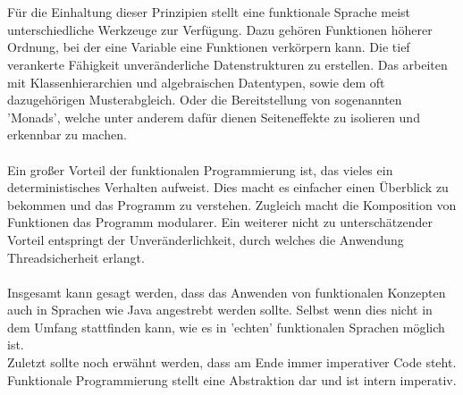 \\\\
Für die Einhaltung dieser Prinzipien stellt eine funktionale Sprache meist unterschiedliche Werkzeuge zur Verfügung. Dazu gehören Funktionen höherer Ordnung, bei der eine Variable eine Funktionen verkörpern kann. Die tief verankerte Fähigkeit unveränderliche Datenstrukturen zu erstellen. Das arbeiten mit Klassenhierarchien und algebraischen Datentypen, sowie dem oft dazugehörigen Musterabgleich. Oder die Bereitstellung von sogenannten 'Monads', welche unter anderem dafür dienen Seiteneffekte zu isolieren und erkennbar zu machen.
\\\\
Ein großer Vorteil der funktionalen Programmierung ist, das vieles ein deterministisches Verhalten aufweist. Dies macht es einfacher einen Überblick zu bekommen und das Programm zu verstehen. Zugleich macht die Komposition von Funktionen das Programm modularer. Ein weiterer nicht zu unterschätzender Vorteil entspringt der Unveränderlichkeit, durch welches die Anwendung Threadsicherheit erlangt.
\\\\
Insgesamt kann gesagt werden, dass das Anwenden von funktionalen Konzepten auch in Sprachen wie Java angestrebt werden sollte. Selbst wenn dies nicht in dem Umfang stattfinden kann, wie es in 'echten' funktionalen Sprachen möglich ist. 
\\
Zuletzt sollte noch erwähnt werden, dass am Ende immer imperativer Code steht. Funktionale Programmierung stellt eine Abstraktion dar und ist intern imperativ.

